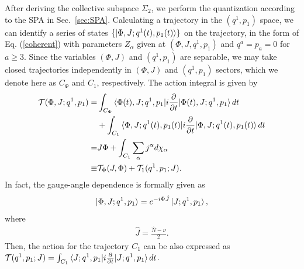 \documentclass[11pt]{book} %
\begin{document}
After deriving the collective subspace $\Sigma_2$, 
we perform the quantization according to the SPA in Sec.~\ref{sec:SPA}.
Calculating a trajectory in the $(q^1,p_1)$ space,
we can identify a series of states $\{\ket{\Phi,J;q^1(t),p_1(t)}\}$
on the trajectory,
in the form of Eq. (\ref{coherent})
with parameters $Z_\alpha$ given at $(\Phi,J,q^1,p_1)$ and $q^a=p_a=0$ for
$a\geq 3$.
Since the variables $(\Phi,J)$ and $(q^1,p_1)$ are separable,
we may take closed trajectories independently in $(\Phi,J)$ and $(q^1,p_1)$
sectors, which we denote here as $C_\Phi$ and $C_1$, respectively.
The action integral is given by
\begin{align}
\mathcal{T}(\Phi,J;q^1,p_1)
=& \int_{C_\Phi} \braket{\Phi(t),J;q^1,p_1|i\frac{\partial}{\partial t}|\Phi(t),J;q^1,p_1} dt \nonumber \\
&+ \int_{C_1} \braket{\Phi,J;q^1(t),p_1(t)|i\frac{\partial}{\partial t}|\Phi,J;q^1(t),p_1(t)} dt
 \nonumber \\
	=& J\Phi + \int_{C_1} \sum_\alpha j^\alpha d\chi_\alpha
	\nonumber \\
	\equiv& \mathcal{T}_\Phi(J,\Phi) +\mathcal{T}_1(q^1,p_1;J) .
\end{align}
In fact, the gauge-angle dependence is formally given as
\begin{equation}
  \ket{\Phi,J;q^1,p_1} = e^{-i\Phi \hat{J}} \ket{J;q^1,p_1},
\end{equation}
where 
\begin{align}
	\hat{J} = \frac{\hat{N}-\nu}{2} .
\end{align}
Then, the action for the trajectory $C_1$ can be also expressed as
$\mathcal{T}(q^1,p_1;J)=
 \int_{C_1} \braket{J;q^1,p_1|i\frac{\partial}{\partial t}|J;q^1,p_1} dt$.
\end{document}
